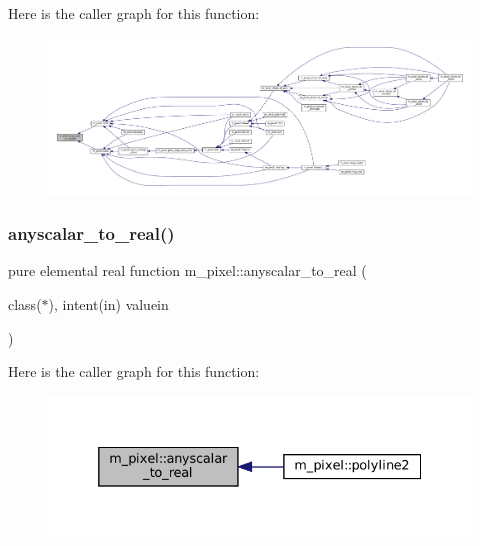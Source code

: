 Here is the caller graph for this function\+:
\nopagebreak
\begin{figure}[H]
\begin{center}
\leavevmode
\includegraphics[width=350pt]{namespacem__pixel_a18d90bca3489d1280c4326e51b5cb7b3_icgraph}
\end{center}
\end{figure}
\mbox{\label{namespacem__pixel_a79feab3c00d124d3f3396ad87ed4940e}} 
\subsubsection{\texorpdfstring{anyscalar\+\_\+to\+\_\+real()}{anyscalar\_to\_real()}}
{\footnotesize\ttfamily pure elemental real function m\+\_\+pixel\+::anyscalar\+\_\+to\+\_\+real (\begin{DoxyParamCaption}\item[{class($\ast$), intent(in)}]{valuein }\end{DoxyParamCaption})\hspace{0.3cm}{\ttfamily [private]}}

Here is the caller graph for this function\+:
\nopagebreak
\begin{figure}[H]
\begin{center}
\leavevmode
\includegraphics[width=332pt]{namespacem__pixel_a79feab3c00d124d3f3396ad87ed4940e_icgraph}
\end{center}
\end{figure}
\mbox{\label{namespacem__pixel_ab881b9c2adff081a086cd83a1f1341fb}} 
